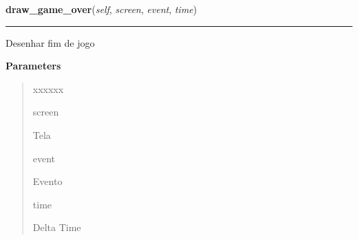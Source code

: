 \hspace{.8\funcindent}\begin{boxedminipage}{\funcwidth}

    \raggedright \textbf{draw\_game\_over}(\textit{self}, \textit{screen}, \textit{event}, \textit{time})

    \vspace{-1.5ex}

    \rule{\textwidth}{0.5\fboxrule}
\setlength{\parskip}{2ex}
    Desenhar fim de jogo

\setlength{\parskip}{1ex}
      \textbf{Parameters}
      \vspace{-1ex}

      \begin{quote}
        \begin{Ventry}{xxxxxx}

          \item[screen]

          Tela

          \item[event]

          Evento

          \item[time]

          Delta Time

        \end{Ventry}

      \end{quote}

    \end{boxedminipage}

    \label{pygame-asteroids:game:GameController:draw_hud}

    \vspace{0.5ex}

